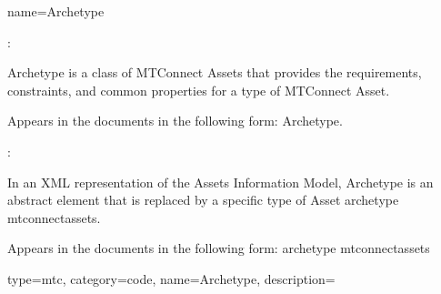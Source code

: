 {
  name={Archetype}
}
{
  :
  
  Archetype is a class of MTConnect Assets that provides the requirements, constraints, and common properties for a type of MTConnect Asset.

  Appears in the documents in the following form: Archetype.

  :
  
  In an XML representation of the Assets Information Model, Archetype is an abstract element that is replaced by a specific type of Asset \gls{archetype mtconnectassets}. 
  
  Appears in the documents in the following form: \gls{archetype mtconnectassets}
}


{
  type=mtc,
  category=code,
  name={Archetype},
  description={}
}

